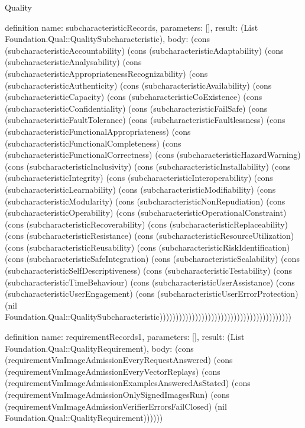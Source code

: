 \begin{lexlean}{Quality}
\begin{semanticmodule}
definition{
  name: subcharacteristicRecords,
  parameters: [],
  result: (List Foundation.Qual::QualitySubcharacteristic),
  body: (cons (subcharacteristicAccountability) (cons (subcharacteristicAdaptability) (cons (subcharacteristicAnalysability) (cons (subcharacteristicAppropriatenessRecognizability) (cons (subcharacteristicAuthenticity) (cons (subcharacteristicAvailability) (cons (subcharacteristicCapacity) (cons (subcharacteristicCoExistence) (cons (subcharacteristicConfidentiality) (cons (subcharacteristicFailSafe) (cons (subcharacteristicFaultTolerance) (cons (subcharacteristicFaultlessness) (cons (subcharacteristicFunctionalAppropriateness) (cons (subcharacteristicFunctionalCompleteness) (cons (subcharacteristicFunctionalCorrectness) (cons (subcharacteristicHazardWarning) (cons (subcharacteristicInclusivity) (cons (subcharacteristicInstallability) (cons (subcharacteristicIntegrity) (cons (subcharacteristicInteroperability) (cons (subcharacteristicLearnability) (cons (subcharacteristicModifiability) (cons (subcharacteristicModularity) (cons (subcharacteristicNonRepudiation) (cons (subcharacteristicOperability) (cons (subcharacteristicOperationalConstraint) (cons (subcharacteristicRecoverability) (cons (subcharacteristicReplaceability) (cons (subcharacteristicResistance) (cons (subcharacteristicResourceUtilization) (cons (subcharacteristicReusability) (cons (subcharacteristicRiskIdentification) (cons (subcharacteristicSafeIntegration) (cons (subcharacteristicScalability) (cons (subcharacteristicSelfDescriptiveness) (cons (subcharacteristicTestability) (cons (subcharacteristicTimeBehaviour) (cons (subcharacteristicUserAssistance) (cons (subcharacteristicUserEngagement) (cons (subcharacteristicUserErrorProtection) (nil Foundation.Qual::QualitySubcharacteristic)))))))))))))))))))))))))))))))))))))))))
}

definition{
  name: requirementRecords1,
  parameters: [],
  result: (List Foundation.Qual::QualityRequirement),
  body: (cons (requirementVmImageAdmissionEveryRequestAnswered) (cons (requirementVmImageAdmissionEveryVectorReplays) (cons (requirementVmImageAdmissionExamplesAnsweredAsStated) (cons (requirementVmImageAdmissionOnlySignedImagesRun) (cons (requirementVmImageAdmissionVerifierErrorsFailClosed) (nil Foundation.Qual::QualityRequirement))))))
}


\end{semanticmodule}
\end{lexlean}
